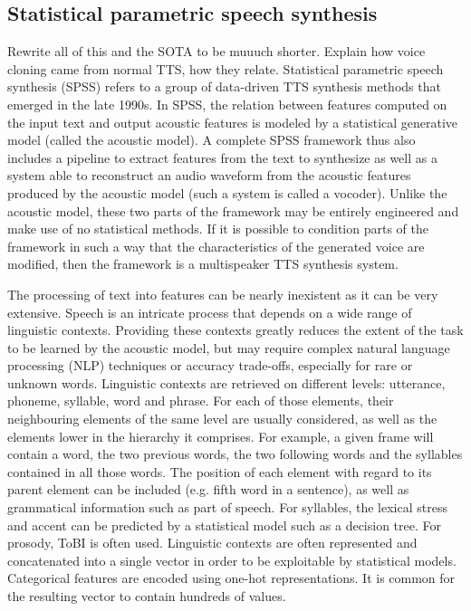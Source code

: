 \documentclass[a4paper, oneside, 12pt, english]{article}
\begin{document}
\subsection{Statistical parametric speech synthesis}
\color{red} Rewrite all of this and the SOTA to be muuuch shorter. Explain how voice cloning came from normal TTS, how they relate. \color{black}
Statistical parametric speech synthesis (SPSS) refers to a group of data-driven TTS synthesis methods that emerged in the late 1990s. In SPSS, the relation between features computed on the input text and output acoustic features is modeled by a statistical generative model (called the acoustic model). A complete SPSS framework thus also includes a pipeline to extract features from the text to synthesize as well as a system able to reconstruct an audio waveform from the acoustic features produced by the acoustic model (such a system is called a vocoder). Unlike the acoustic model, these two parts of the framework may be entirely engineered and make use of no statistical methods. If it is possible to condition parts of the framework in such a way that the characteristics of the generated voice are modified, then the framework is a multispeaker TTS synthesis system.

The processing of text into features can be nearly inexistent as it can be very extensive. Speech is an intricate process that depends on a wide range of linguistic contexts. Providing these contexts greatly reduces the extent of the task to be learned by the acoustic model, but may require complex natural language processing (NLP) techniques or accuracy trade-offs, especially for rare or unknown words. Linguistic contexts are retrieved on different levels: utterance, phoneme, syllable, word and phrase. For each of those elements, their neighbouring elements of the same level are usually considered, as well as the elements lower in the hierarchy it comprises. For example, a given frame will contain a word, the two previous words, the two following words and the syllables contained in all those words. The position of each element with regard to its parent element can be included (e.g. fifth word in a sentence), as well as grammatical information such as part of speech. For syllables, the lexical stress and accent can be predicted by a statistical model such as a decision tree. For prosody, ToBI \citep{TOBI} is often used. Linguistic contexts are often represented and concatenated into a single vector in order to be exploitable by statistical models. Categorical features are encoded using one-hot representations. It is common for the resulting vector to contain hundreds of values.
\end{document}
